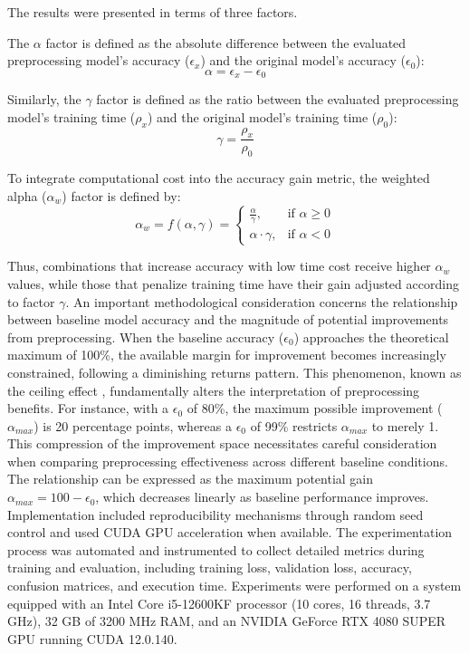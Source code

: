\documentclass[journal]{IEEEtran}
\begin{document}
The results were presented in terms of three factors.

The $\alpha$ factor is defined as the absolute difference between the evaluated preprocessing model's accuracy ($\epsilon_x$) and the original model's accuracy ($\epsilon_0$):
\begin{equation}
\alpha = \epsilon_x - \epsilon_0
\end{equation}

Similarly, the $\gamma$ factor is defined as the ratio between the evaluated preprocessing model's training time ($\rho_x$) and the original model's training time ($\rho_0$):
\begin{equation}
\gamma = \frac{\rho_x}{\rho_0}
\end{equation}

To integrate computational cost into the accuracy gain metric, the weighted alpha ($\alpha_w$) factor is defined by:
\begin{equation}
\alpha_w = f(\alpha, \gamma) =
\begin{cases}
\frac{\alpha}{\gamma}, & \text{if } \alpha \geq 0 \\
\alpha \cdot \gamma, & \text{if } \alpha < 0
\end{cases}
\label{eq:1}
\end{equation}

Thus, combinations that increase accuracy with low time cost receive higher $\alpha_w$ values, while those that penalize training time have their gain adjusted according to factor $\gamma$. An important methodological consideration concerns the relationship between baseline model accuracy and the magnitude of potential improvements from preprocessing. When the baseline accuracy ($\epsilon_0$) approaches the theoretical maximum of 100\%, the available margin for improvement becomes increasingly constrained, following a diminishing returns pattern. This phenomenon, known as the ceiling effect \cite{vogt2005scale}, fundamentally alters the interpretation of preprocessing benefits. For instance, with a $\epsilon_{0}$ of 80\%, the maximum possible improvement ($\alpha_{max}$) is 20 percentage points, whereas a $\epsilon_{0}$ of 99\% restricts $\alpha_{max}$ to merely 1. This compression of the improvement space necessitates careful consideration when comparing preprocessing effectiveness across different baseline conditions. The relationship can be expressed as the maximum potential gain $\alpha_{max} = 100 - \epsilon_0$, which decreases linearly as baseline performance improves. Implementation included reproducibility mechanisms through random seed control and used CUDA GPU acceleration when available. The experimentation process was automated and instrumented to collect detailed metrics during training and evaluation, including training loss, validation loss, accuracy, confusion matrices, and execution time. Experiments were performed on a system equipped with an Intel Core i5-12600KF processor (10 cores, 16 threads, 3.7 GHz), 32 GB of 3200 MHz RAM, and an NVIDIA GeForce RTX 4080 SUPER GPU running CUDA 12.0.140.
\end{document}
